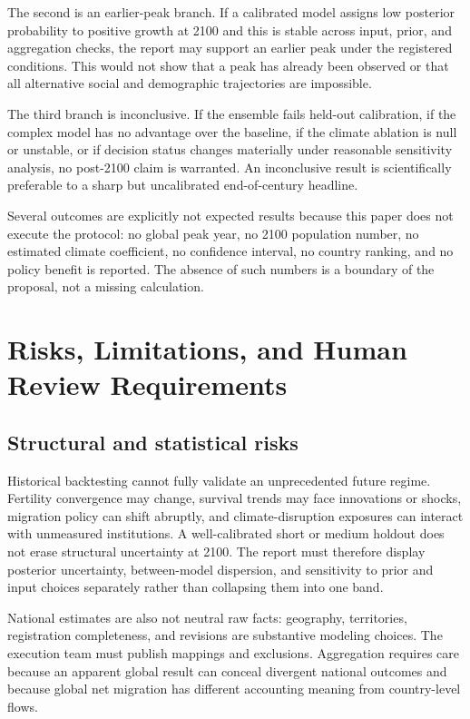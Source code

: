 \documentclass[conference]{IEEEtran}
\begin{document}
The second is an earlier-peak branch. If a calibrated model assigns low posterior probability to positive growth at 2100 and this is stable across input, prior, and aggregation checks, the report may support an earlier peak under the registered conditions. This would not show that a peak has already been observed or that all alternative social and demographic trajectories are impossible.

The third branch is inconclusive. If the ensemble fails held-out calibration, if the complex model has no advantage over the baseline, if the climate ablation is null or unstable, or if decision status changes materially under reasonable sensitivity analysis, no post-2100 claim is warranted. An inconclusive result is scientifically preferable to a sharp but uncalibrated end-of-century headline.

Several outcomes are explicitly not expected results because this paper does not execute the protocol: no global peak year, no 2100 population number, no estimated climate coefficient, no confidence interval, no country ranking, and no policy benefit is reported. The absence of such numbers is a boundary of the proposal, not a missing calculation.

\section{Risks, Limitations, and Human Review Requirements}

\subsection{Structural and statistical risks}

Historical backtesting cannot fully validate an unprecedented future regime. Fertility convergence may change, survival trends may face innovations or shocks, migration policy can shift abruptly, and climate-disruption exposures can interact with unmeasured institutions. A well-calibrated short or medium holdout does not erase structural uncertainty at 2100. The report must therefore display posterior uncertainty, between-model dispersion, and sensitivity to prior and input choices separately rather than collapsing them into one band.

National estimates are also not neutral raw facts: geography, territories, registration completeness, and revisions are substantive modeling choices. The execution team must publish mappings and exclusions. Aggregation requires care because an apparent global result can conceal divergent national outcomes and because global net migration has different accounting meaning from country-level flows.
\end{document}
